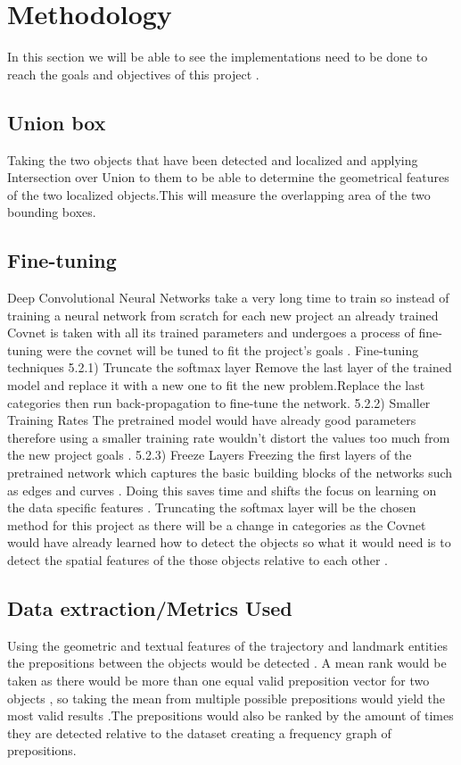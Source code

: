 \documentclass{csfyp}
\begin{document}
\section{Methodology}
In this section we will be able to see the implementations need to be done to reach the goals and objectives of this project .

\subsection{Union box}
Taking the two objects that have been detected and localized and applying Intersection over Union to them to be able to determine the geometrical features of the two localized objects.This will measure the overlapping area of the two bounding boxes. 

\subsection{Fine-tuning}
Deep Convolutional Neural Networks take a very long time to train so instead of training a neural network from scratch for each new project an already trained Covnet is taken with all its trained parameters and undergoes a process of fine-tuning were the covnet will be tuned to fit the project's goals . 
Fine-tuning techniques 
5.2.1) Truncate the softmax layer
Remove the last layer of the trained model and replace it with a new one to fit the new problem.Replace the last categories then run back-propagation to fine-tune the network.
5.2.2) Smaller Training Rates
The pretrained model would have already good parameters therefore using a smaller training rate wouldn’t distort the values too much from the new project goals .
	5.2.3) Freeze Layers
Freezing the first layers of the pretrained network which captures the basic building blocks of the networks such as edges and curves . Doing this saves time and shifts the focus on learning on the data specific features .
Truncating the softmax layer will be the chosen method for this project as there will be a change in categories as the Covnet would have already learned how to detect the objects so what it would need is to detect the spatial features of the those objects relative to each other .

\subsection{Data extraction/Metrics Used}
Using the geometric and textual features of the trajectory and landmark entities the prepositions between the objects would be detected . A mean rank would be taken as there would be more than one equal valid preposition vector for two objects , so taking the mean from multiple possible prepositions would yield the most valid results .The prepositions would also be ranked by the amount of times they are detected relative to the dataset creating a frequency graph of prepositions. 
\end{document}
